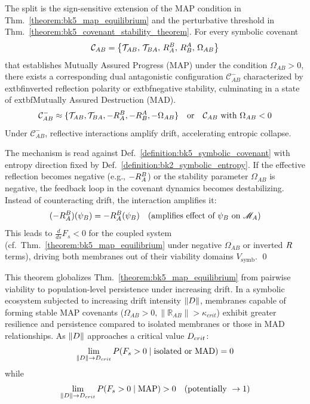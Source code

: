 \begin{proposition}
\label{proposition:bk5_map_mad_dichotomy}
The split is the sign-sensitive extension of the MAP condition in Thm.~\ref{theorem:bk5_map_equilibrium} and the perturbative threshold in Thm.~\ref{theorem:bk5_covenant_stability_theorem}.
For every symbolic covenant
\[
\mathcal{C}_{AB} = \left\{ \mathcal{T}_{AB},\, \mathcal{T}_{BA},\, R_A^B,\, R_B^A,\, \Omega_{AB} \right\}
\]
that establishes Mutually Assured Progress (MAP) under the condition \( \Omega_{AB} > 0 \),
there exists a corresponding dual antagonistic configuration \( \mathcal{C}_{AB}^{-} \)
characterized by 	extbf{inverted reflection polarity} or 	extbf{negative stability}, culminating in a
state of 	extbf{Mutually Assured Destruction (MAD)}.
\begin{equation}
\mathcal{C}_{AB}^{-} \approx \{\mathcal{T}_{AB}, \mathcal{T}_{BA}, -R_A^B, -R_B^A, -\Omega_{AB}\} \quad \text{or} \quad \mathcal{C}_{AB} \text{ with } \Omega_{AB} < 0
\end{equation}
Under $\mathcal{C}_{AB}^{-}$, reflective interactions amplify drift, accelerating entropic collapse.
\end{proposition}
\begin{demonstratio}
\label{demonstratio:bk5_negative_reflection_instability}
The mechanism is read against Def.~\ref{definition:bk5_symbolic_covenant} with entropy direction fixed by Def.~\ref{definition:bk2_symbolic_entropy}.
If the effective reflection becomes negative (e.g., $-R_A^B$) or the stability parameter $\Omega_{AB}$ is negative, the feedback loop in the covenant dynamics becomes destabilizing. Instead of counteracting drift, the interaction amplifies it:
\begin{equation}
(-R_A^B)(\psi_B) = -R_A^B(\psi_B) \quad \text{(amplifies effect of } \psi_B \text{ on } \mathscr{M}_A)
\end{equation}
This leads to $\frac{d}{ds}F_s < 0$ for the coupled system (cf.~Thm.~\ref{theorem:bk5_map_equilibrium} under negative $\Omega_{AB}$ or inverted $R$ terms), driving both membranes out of their viability domains $V_{\text{symb}}$. \qed
\end{demonstratio}
\begin{theorem}
\label{theorem:bk5__map_dominance}
This theorem globalizes Thm.~\ref{theorem:bk5_map_equilibrium} from pairwise viability to population-level persistence under increasing drift.
In a symbolic ecosystem subjected to increasing drift intensity $\|D\|$, membranes capable of forming stable MAP covenants ($\Omega_{AB}>0, \|\mathbb{R}_{AB}\| > \kappa_{crit}$) exhibit greater resilience and persistence compared to isolated membranes or those in MAD relationships. As $\|D\|$ approaches a critical value $D_{crit}$:
\begin{equation}
\lim_{\|D\| \to D_{crit}} P(F_s > 0 \mid \text{isolated or MAD}) = 0
\end{equation}
while
\begin{equation}
\lim_{\|D\| \to D_{crit}} P(F_s > 0 \mid \text{MAP}) > 0 \quad (\text{potentially } \to 1)
\end{equation}
\end{theorem}
